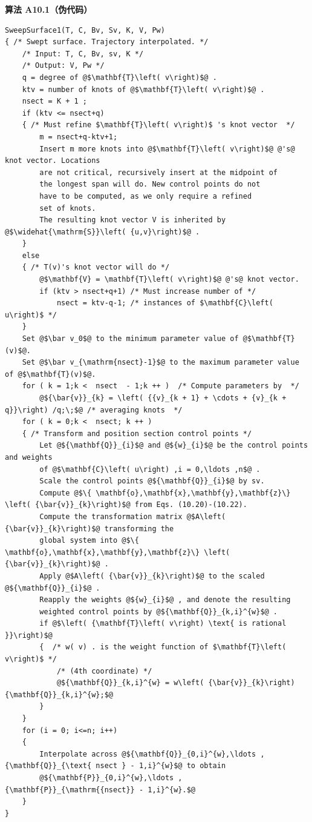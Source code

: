 \documentclass[../main.tex]{subfiles}
\begin{document}
\par\medskip\noindent\textbf{算法 A10.1（伪代码）}\par
\begin{verbatim}
SweepSurface1(T, C, Bv, Sv, K, V, Pw)
{ /* Swept surface. Trajectory interpolated. */
    /* Input: T, C, Bv, sv, K */
    /* Output: V, Pw */
    q = degree of @$\mathbf{T}\left( v\right)$@ .
    ktv = number of knots of @$\mathbf{T}\left( v\right)$@ .
    nsect = K + 1 ;
    if (ktv <= nsect+q)
    { /* Must refine $\mathbf{T}\left( v\right)$ 's knot vector  */
        m = nsect+q-ktv+1;
        Insert m more knots into @$\mathbf{T}\left( v\right)$@ @'s@ knot vector. Locations
        are not critical, recursively insert at the midpoint of
        the longest span will do. New control points do not
        have to be computed, as we only require a refined
        set of knots.
        The resulting knot vector V is inherited by @$\widehat{\mathrm{S}}\left( {u,v}\right)$@ .
    }
    else
    { /* T(v)'s knot vector will do */
        @$\mathbf{V} = \mathbf{T}\left( v\right)$@ @'s@ knot vector.
        if (ktv > nsect+q+1) /* Must increase number of */
            nsect = ktv-q-1; /* instances of $\mathbf{C}\left( u\right)$ */
    }
    Set @$\bar v_0$@ to the minimum parameter value of @$\mathbf{T}(v)$@.
    Set @$\bar v_{\mathrm{nsect}-1}$@ to the maximum parameter value of @$\mathbf{T}(v)$@.
    for ( k = 1;k <  nsect  - 1;k ++ )  /* Compute parameters by  */
        @${\bar{v}}_{k} = \left( {{v}_{k + 1} + \cdots + {v}_{k + q}}\right) /q;\;$@ /* averaging knots  */
    for ( k = 0;k <  nsect; k ++ )
    { /* Transform and position section control points */
        Let @${\mathbf{Q}}_{i}$@ and @${w}_{i}$@ be the control points and weights
        of @$\mathbf{C}\left( u\right) ,i = 0,\ldots ,n$@ .
        Scale the control points @${\mathbf{Q}}_{i}$@ by sv.
        Compute @$\{ \mathbf{o},\mathbf{x},\mathbf{y},\mathbf{z}\} \left( {\bar{v}}_{k}\right)$@ from Eqs. (10.20)-(10.22).
        Compute the transformation matrix @$A\left( {\bar{v}}_{k}\right)$@ transforming the
        global system into @$\{ \mathbf{o},\mathbf{x},\mathbf{y},\mathbf{z}\} \left( {\bar{v}}_{k}\right)$@ .
        Apply @$A\left( {\bar{v}}_{k}\right)$@ to the scaled @${\mathbf{Q}}_{i}$@ .
        Reapply the weights @${w}_{i}$@ , and denote the resulting
        weighted control points by @${\mathbf{Q}}_{k,i}^{w}$@ .
        if @$\left( {\mathbf{T}\left( v\right) \text{ is rational }}\right)$@
        {  /* w( v) . is the weight function of $\mathbf{T}\left( v\right)$ */
            /* (4th coordinate) */
            @${\mathbf{Q}}_{k,i}^{w} = w\left( {\bar{v}}_{k}\right) {\mathbf{Q}}_{k,i}^{w};$@
        }
    }
    for (i = 0; i<=n; i++)
    {
        Interpolate across @${\mathbf{Q}}_{0,i}^{w},\ldots ,{\mathbf{Q}}_{\text{ nsect } - 1,i}^{w}$@ to obtain
        @${\mathbf{P}}_{0,i}^{w},\ldots ,{\mathbf{P}}_{\mathrm{{nsect}} - 1,i}^{w}.$@
    }
}
\end{verbatim}
\end{document}
